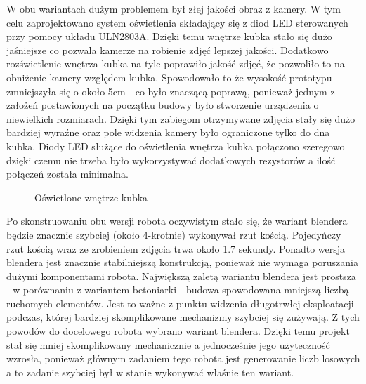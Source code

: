 W obu wariantach dużym problemem był złej jakości obraz z kamery. W tym celu zaprojektowano system oświetlenia składający się z diod
LED sterowanych przy pomocy układu ULN2803A. Dzięki temu wnętrze kubka stało się dużo jaśniejsze co pozwala kamerze na
robienie zdjęć lepszej jakości. Dodatkowo rozświetlenie wnętrza kubka na tyle poprawiło
jakość zdjęć, że pozwoliło to na obniżenie kamery względem kubka. Spowodowało to że wysokość prototypu zmniejszyła się o około 5cm - 
co było znaczącą poprawą, ponieważ jednym z założeń postawionych na początku budowy było stworzenie urządzenia o niewielkich rozmiarach.
Dzięki tym zabiegom otrzymywane zdjęcia stały się dużo bardziej wyraźne oraz pole widzenia kamery było ograniczone tylko do dna kubka.
Diody LED służące do oświetlenia wnętrza kubka połączono szeregowo dzięki czemu nie trzeba było wykorzystywać dodatkowych rezystorów a ilość połączeń
została minimalna.

\begin{figure}[H]
    \centering
    \caption{\label{fig:jasno}Oświetlone wnętrze kubka}
\end{figure}

Po skonstruowaniu obu wersji robota oczywistym stało się, że wariant blendera będzie znacznie szybciej (około 4-krotnie) wykonywał rzut kością.
Pojedyńczy rzut kością wraz ze zrobieniem zdjęcia trwa około 1.7 sekundy.
Ponadto wersja blendera jest znacznie stabilniejszą konstrukcją, ponieważ nie wymaga poruszania dużymi komponentami robota. 
Największą zaletą wariantu blendera jest prostsza - w porównaniu z wariantem betoniarki - budowa spowodowana mniejszą liczbą ruchomych elementów. Jest to ważne z punktu widzenia
długotrwłej eksploatacji podczas, której bardziej skomplikowane mechanizmy szybciej się zużywają. Z tych powodów do docelowego robota wybrano 
wariant blendera. Dzięki temu projekt stał się mniej skomplikowany mechanicznie a jednocześnie jego użyteczność wzrosła, ponieważ
głównym zadaniem tego robota jest generowanie liczb losowych a to zadanie szybciej był w stanie wykonywać właśnie ten wariant.

